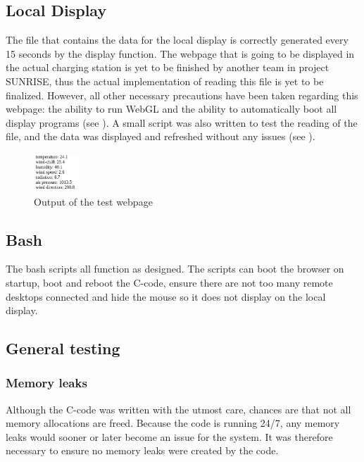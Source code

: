 \subsection{Local Display}
The file that contains the data for the local display is correctly generated every 15 seconds by the display function. The webpage that is going to be displayed in the actual charging station is yet to be finished by another team in project SUNRISE, thus the actual implementation of reading this file is yet to be finalized. However, all other necessary precautions have been taken regarding this webpage: the ability to run WebGL and the ability to automatically boot all display programs (see ). A small script was also written to test the reading of the file, and the data was displayed and refreshed without any issues (see ).

\begin{figure}[!ht]
  \centering
    \includegraphics[width=0.15\textwidth]{images/test_display.png}
      \caption{Output of the test webpage}\label{fig:test_display}
\end{figure}

\subsection{Bash}\label{sec:bash_results}
The bash scripts all function as designed. The scripts can boot the browser on startup, boot and reboot the C-code, ensure there are not too many remote desktops connected and hide the mouse so it does not display on the local display.

\subsection{General testing}
\subsubsection{Memory leaks}
Although the C-code was written with the utmost care, chances are that not all memory allocations are freed. Because the code is running 24/7, any memory leaks would sooner or later become an issue for the system. It was therefore necessary to ensure no memory leaks were created by the code.\\

